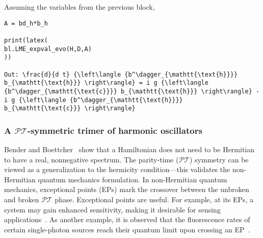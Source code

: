 \documentclass[5p, twocolumn, 10pt, sort&compress]{elsarticle}
\begin{document}
Assuming the variables from the previous block, 
\begin{verbatim}
A = bd_h*b_h

print(latex(
bl.LME_expval_evo(H,D,A)
))

Out: \frac{d}{d t} {\left\langle {b^\dagger_{\mathtt{\text{h}}}} b_{\mathtt{\text{h}}} \right\rangle} = i g {\left\langle {b^\dagger_{\mathtt{\text{c}}}} b_{\mathtt{\text{h}}} \right\rangle} - i g {\left\langle {b^\dagger_{\mathtt{\text{h}}}} b_{\mathtt{\text{c}}} \right\rangle}
\end{verbatim}


\subsubsection{A $\mathcal{P}\mathcal{T}$-symmetric trimer of harmonic oscillators}

Bender and Boettcher~\cite{Bender1998} show that a Hamiltonian does not need to be Hermitian to have a real, nonnegative spectrum. The parity-time ($\mathcal{P}\mathcal{T}$) symmetry can be viewed as a generalization to the hermicity condition---this validates the non-Hermitian quantum mechanics formulation. In non-Hermitian quantum mechanics, exceptional points (EPs) mark the crossover between the unbroken and broken $\mathcal{P}\mathcal{T}$ phase. Exceptional points are useful. For example, at its EPs, a system may gain enhanced sensitivity, making it desirable for sensing applications~\cite{Wiersig2020}. As another example, it is observed that the fluorescence rates of certain single-photon sources reach their quantum limit upon crossing an EP~\cite{Zhou2024}. 
\end{document}
